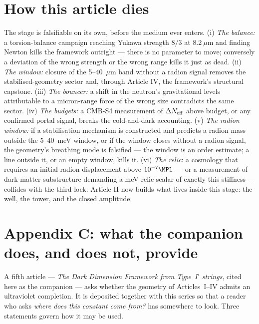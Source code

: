 \section{How this article dies}
The stage is falsifiable on its own, before the medium ever enters. (i) \emph{The balance:} a torsion-balance campaign reaching Yukawa strength $8/3$ at $8.2~\mu$m and finding Newton kills the framework outright --- there is no parameter to move; conversely a deviation of the wrong strength or the wrong range kills it just as dead. (ii) \emph{The window:} closure of the 5--40~$\mu$m band without a radion signal removes the stabilised-geometry sector and, through Article IV, the framework's structural capstone. (iii) \emph{The bouncer:} a shift in the neutron's gravitational levels attributable to a micron-range force of the wrong size contradicts the same sector. (iv) \emph{The budgets:} a CMB-S4 measurement of $\Delta N_{\rm eff}$ above budget, or any confirmed portal signal, breaks the cold-and-dark accounting. (v) \emph{The radion window:} if a stabilisation mechanism is constructed and predicts a radion mass outside the 5--40~meV window, or if the window closes without a radion signal, the geometry's breathing mode is falsified --- the window is an order estimate; a line outside it, or an empty window, kills it. (vi) \emph{The relic}: a cosmology that requires an initial radion displacement above $10^{-7}\MPl$ --- or a measurement of dark-matter substructure demanding a meV relic scalar of exactly this stiffness --- collides with the third lock. Article II now builds what lives inside this stage: the well, the tower, and the closed amplitude.



\toolsstatement
{}


\section*{Appendix C: what the companion does, and does not, provide}
\label{app:companion}

A fifth article --- \emph{The Dark Dimension Framework from Type~I$'$ strings}, cited here as the companion --- asks whether the geometry of Articles~I--IV admits an ultraviolet completion. It is deposited together with this series so that a reader who asks \emph{where does this constant come from?} has somewhere to look. Three statements govern how it may be used.

